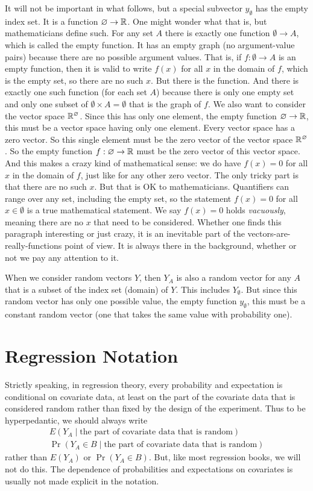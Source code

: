 It will not be important in what follows, but a special subvector
$y_\emptyset$ has the empty index set.
It is a function $\varnothing \to \mathbb{R}$.
One might wonder what that is, but mathematicians define such.
For any set $A$ there is exactly one function $\emptyset \to A$,
which is called the empty function.  It has an empty graph
(no argument-value pairs) because there are no possible argument values.
That is, if $f : \emptyset \to A$ is an empty function, then it is
valid to write $f(x)$ for all $x$ in the domain of $f$, which is the
empty set, so there are no such $x$.  But there is the function.
And there is exactly one such function (for each set $A$) because there
is only one empty set and only one subset of
$\emptyset \times A = \emptyset$ that is the graph of $f$.
We also want to consider the vector space $\mathbb{R}^\varnothing$.
Since this has only one element, the empty function $\varnothing \to \mathbb{R}$,
this must be a vector space having only one element.  Every vector space
has a zero vector.  So this single element must be the zero vector of the
vector space $\mathbb{R}^\varnothing$.
So the empty function $f : \varnothing \to \mathbb{R}$ must be the zero vector
of this vector space.  And this makes a crazy kind of mathematical sense:
we do have $f(x) = 0$ for all $x$ in the domain of $f$, just like for
any other zero vector.  The only tricky part is that there are no such $x$.
But that is OK to mathematicians.  Quantifiers can range over any set,
including the empty set, so the statement $f(x) = 0$ for all $x \in \emptyset$
is a true mathematical statement.  We say $f(x) = 0$ holds \emph{vacuously},
meaning there are no $x$ that need to be considered.
Whether one finds this paragraph interesting or just crazy, it is an
inevitable part of the vectors-are-really-functions point of view.
It is always there in the background, whether or not we pay any attention
to it.

When we consider random vectors $Y$, then $Y_A$ is also a random vector
for any $A$ that is a subset of the index set (domain) of $Y$.
This includes $Y_\emptyset$.  But since this random vector has only one
possible value, the empty function $y_\emptyset$, this must be a constant
random vector (one that takes the same value with probability one).

\section{Regression Notation}

Strictly speaking, in regression theory, every probability and expectation
is conditional on covariate data, at least on the part of the covariate data
that is considered random rather than fixed by the design of the experiment.
Thus to be hyperpedantic, we should always write
\begin{gather*}
   E(Y_A \mid \text{the part of covariate data that is random})
   \\
   \Pr(Y_A \in B \mid \text{the part of covariate data that is random})
\end{gather*}
rather than $E(Y_A)$ or $\Pr(Y_A \in B)$.  But, like most regression books,
we will not do this.  The dependence of probabilities and expectations on
covariates is usually not made explicit in the notation.

